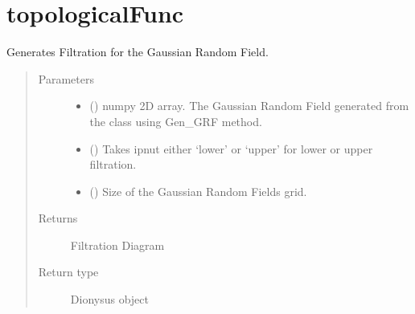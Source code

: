 \documentclass[letterpaper,10pt,english]{sphinxmanual}
\begin{document}
\chapter{topologicalFunc}
\label{\detokenize{topologicalFunc:topologicalfunc}}\label{\detokenize{topologicalFunc:id1}}\label{\detokenize{topologicalFunc::doc}}\label{\detokenize{topologicalFunc:module-topologicalFunc}}

\begin{fulllineitems}
\label{\detokenize{topologicalFunc:topologicalFunc.GaussianFiltration}}
\sphinxAtStartPar
Generates Filtration for the Gaussian Random Field.
\begin{quote}\begin{description}
\item[{Parameters}] \leavevmode\begin{itemize}
\item {} 
\sphinxAtStartPar
{} () \textendash{} numpy 2\sphinxhyphen{}D array. The Gaussian Random Field generated from the class using Gen\_GRF method.

\item {} 
\sphinxAtStartPar
{} () \textendash{} Takes ipnut either ‘lower’ or ‘upper’ for lower or upper filtration.

\item {} 
\sphinxAtStartPar
{} () \textendash{} Size of the Gaussian Random Fields grid.

\end{itemize}

\item[{Returns}] \leavevmode
\sphinxAtStartPar
Filtration Diagram

\item[{Return type}] \leavevmode
\sphinxAtStartPar
Dionysus object

\end{description}\end{quote}

\end{fulllineitems}
\end{document}
